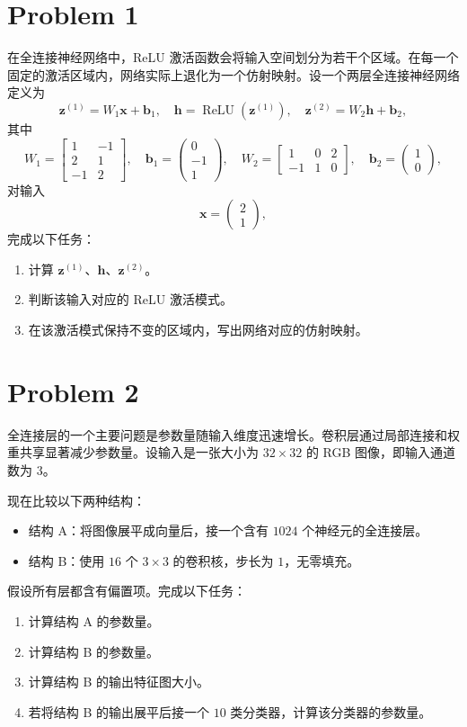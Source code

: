 \section*{Problem 1}

在全连接神经网络中，ReLU 激活函数会将输入空间划分为若干个区域。在每一个固定的激活区域内，网络实际上退化为一个仿射映射。设一个两层全连接神经网络定义为
\[
\bm{z}^{(1)} = W_1 \bm{x} + \bm{b}_1,\quad
\bm{h} = \operatorname{ReLU}(\bm{z}^{(1)}),\quad
\bm{z}^{(2)} = W_2 \bm{h} + \bm{b}_2,
\]
其中
\[
W_1 = \begin{bmatrix}
    1 & -1 \\
    2 & 1 \\
    -1 & 2
\end{bmatrix},\quad
\bm{b}_1 = \begin{pmatrix} 0 \\ -1 \\ 1 \end{pmatrix},\quad
W_2 = \begin{bmatrix} 1 & 0 & 2 \\ -1 & 1 & 0 \end{bmatrix},\quad
\bm{b}_2 = \begin{pmatrix} 1 \\ 0 \end{pmatrix},
\]
对输入
\[
\bm{x} = \begin{pmatrix} 2 \\ 1 \end{pmatrix},
\]
完成以下任务：
\begin{enumerate}
    \item 计算 $\bm{z}^{(1)}$、$\bm{h}$、$\bm{z}^{(2)}$。
    \item 判断该输入对应的 ReLU 激活模式。
    \item 在该激活模式保持不变的区域内，写出网络对应的仿射映射。
\end{enumerate}

\section*{Problem 2}

全连接层的一个主要问题是参数量随输入维度迅速增长。卷积层通过局部连接和权重共享显著减少参数量。设输入是一张大小为 $32 \times 32$ 的 RGB 图像，即输入通道数为 $3$。

现在比较以下两种结构：
\begin{itemize}
    \item 结构 A：将图像展平成向量后，接一个含有 $1024$ 个神经元的全连接层。
    \item 结构 B：使用 $16$ 个 $3 \times 3$ 的卷积核，步长为 $1$，无零填充。
\end{itemize}
假设所有层都含有偏置项。完成以下任务：
\begin{enumerate}
    \item 计算结构 A 的参数量。
    \item 计算结构 B 的参数量。
    \item 计算结构 B 的输出特征图大小。
    \item 若将结构 B 的输出展平后接一个 $10$ 类分类器，计算该分类器的参数量。
\end{enumerate}

